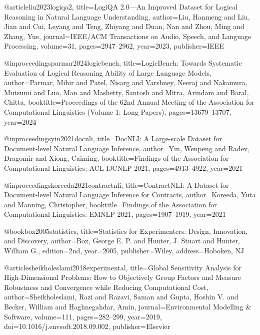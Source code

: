 @article{liu2023logiqa2,
  title={{LogiQA} 2.0---An Improved Dataset for Logical Reasoning in Natural Language Understanding},
  author={Liu, Hanmeng and Liu, Jian and Cui, Leyang and Teng, Zhiyang and Duan, Nan and Zhou, Ming and Zhang, Yue},
  journal={IEEE/ACM Transactions on Audio, Speech, and Language Processing},
  volume={31},
  pages={2947--2962},
  year={2023},
  publisher={IEEE}
}

@inproceedings{parmar2024logicbench,
  title={{LogicBench}: Towards Systematic Evaluation of Logical Reasoning Ability of Large Language Models},
  author={Parmar, Mihir and Patel, Nisarg and Varshney, Neeraj and Nakamura, Mutsumi and Luo, Man and Mashetty, Santosh and Mitra, Arindam and Baral, Chitta},
  booktitle={Proceedings of the 62nd Annual Meeting of the Association for Computational Linguistics (Volume 1: Long Papers)},
  pages={13679--13707},
  year={2024}
}

@inproceedings{yin2021docnli,
  title={{DocNLI}: A Large-scale Dataset for Document-level Natural Language Inference},
  author={Yin, Wenpeng and Radev, Dragomir and Xiong, Caiming},
  booktitle={Findings of the Association for Computational Linguistics: ACL-IJCNLP 2021},
  pages={4913--4922},
  year={2021}
}

@inproceedings{koreeda2021contractnli,
  title={{ContractNLI}: A Dataset for Document-level Natural Language Inference for Contracts},
  author={Koreeda, Yuta and Manning, Christopher},
  booktitle={Findings of the Association for Computational Linguistics: EMNLP 2021},
  pages={1907--1919},
  year={2021}
}


@book{box2005statistics,
  title={Statistics for Experimenters: Design, Innovation, and Discovery},
  author={Box, George E. P. and Hunter, J. Stuart and Hunter, William G.},
  edition={2nd},
  year={2005},
  publisher={Wiley},
  address={Hoboken, NJ}
}

@article{sheikholeslami2018experimental,
  title={Global Sensitivity Analysis for High-Dimensional Problems: How to Objectively Group Factors and Measure Robustness and Convergence while Reducing Computational Cost},
  author={Sheikholeslami, Razi and Razavi, Saman and Gupta, Hoshin V. and Becker, William and Haghnegahdar, Amin},
  journal={Environmental Modelling \& Software},
  volume={111},
  pages={282--299},
  year={2019},
  doi={10.1016/j.envsoft.2018.09.002},
  publisher={Elsevier}
}


